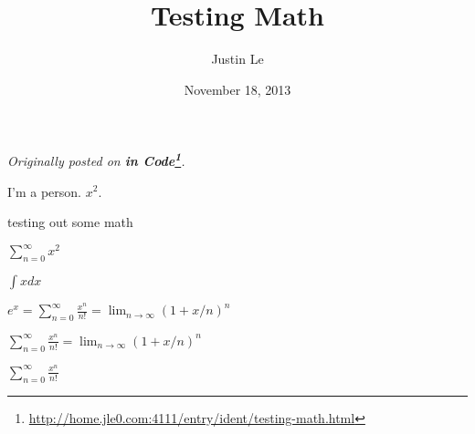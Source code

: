 \documentclass[]{article}
\title{Testing Math}
\author{Justin Le}
\date{November 18, 2013}
\renewcommand{\href}[2]{#2\footnote{\url{#1}}}
\begin{document}
\maketitle

\emph{Originally posted on \textbf{\href{http://home.jle0.com:4111/entry/ident/testing-math.html}{in
Code}}.}

I'm a person. \(x^2\).

testing out some math

\(\sum_{n=0}^\infty x^2\)

\(\int x dx\)

\(e^x = \sum_{n=0}^\infty \frac{x^n}{n!} = \lim_{n\rightarrow\infty} (1+x/n)^n\)

\(\sum_{n=0}^\infty \frac{x^n}{n!} = \lim_{n\rightarrow\infty} (1+x/n)^n\)

\(\sum_{n=0}^\infty \frac{x^n}{n!}\)
\end{document}
